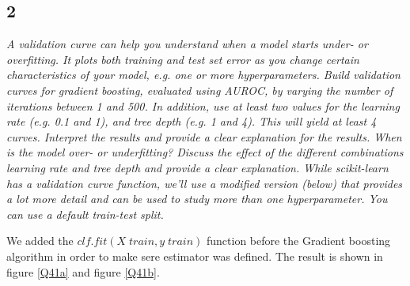 \documentclass[a4paper,12pt]{article}
\begin{document}
{\subsection{2}
{\it A validation curve can help you understand when a model starts under- or overfitting. It plots both training and test set error as you change certain characteristics of your model, e.g. one or more hyperparameters. Build validation curves for gradient boosting, evaluated using AUROC, by varying the number of iterations between 1 and 500. In addition, use at least two values for the learning rate (e.g. 0.1 and 1), and tree depth (e.g. 1 and 4). This will yield at least 4 curves. Interpret the results and provide a clear explanation for the results. When is the model over- or underfitting? Discuss the effect of the different combinations learning rate and tree depth and provide a clear explanation.
While scikit-learn has a validation curve function, we'll use a modified version (below) that provides a lot more detail and can be used to study more than one hyperparameter. You can use a default train-test split.}

\textnormal{We added the $clf.fit(X\; train,y\; train)$ function before the Gradient boosting algorithm in order to make sere estimator was defined. The result is shown in figure \ref{Q41a} and figure \ref{Q41b}.}
 
}
\end{document}
